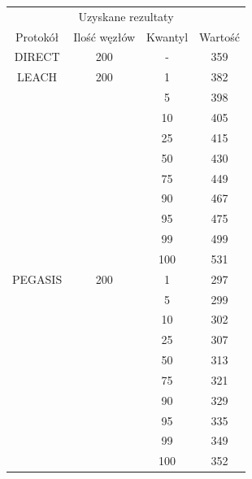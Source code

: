 \documentclass[a4paper,12pt,twoside,openany]{report}
\begin{document}
\begin{longtable}{*{4}{c}}
\toprule
\multicolumn{4}{c}{Uzyskane rezultaty} \\
Protokół	& Ilość węzłów	& Kwantyl	& Wartość \\
\midrule
\endhead
DIRECT	& 200 	& -	& 359 \\*
\midrule
LEACH	& 200	& 1	& 382 \\*
	&	& 5	& 398 \\*
	&	& 10	& 405 \\*
	&	& 25	& 415 \\*
	&	& 50	& 430 \\*
	&	& 75	& 449 \\*
	&	& 90	& 467 \\*
	&	& 95	& 475 \\*
	&	& 99	& 499 \\*
	&	& 100	& 531 \\*
\midrule
PEGASIS	& 200	& 1	& 297 \\*
	&	& 5	& 299 \\*
	&	& 10	& 302 \\*
	&	& 25	& 307 \\*
	&	& 50	& 313 \\*
	&	& 75	& 321 \\*
	&	& 90	& 329 \\*
	&	& 95	& 335 \\*
	&	& 99	& 349 \\*
	&	& 100	& 352 \\*
\bottomrule
\end{longtable}
\end{document}
